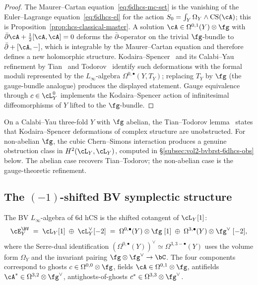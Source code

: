 \begin{proof}
The Maurer--Cartan equation~\eqref{eq:6dhcs-mc-set} is the vanishing
of the Euler--Lagrange equation~\eqref{eq:6dhcs-el} for the action
$S_0 = \int_Y\Omega_Y\wedge\mathrm{CS}(\cA)$; this is
Proposition~\ref{prop:hcs-classical-master}. A solution
$\cA\in\Omega^{0,1}(Y)\otimes\fg$ with
$\bar\partial\cA + \tfrac12[\cA,\cA] = 0$ deforms the
$\bar\partial$-operator on the trivial $\fg$-bundle to
$\bar\partial + [\cA,-]$, which is integrable by the
Maurer--Cartan equation and therefore defines a new holomorphic
structure. Kodaira--Spencer~\cite{KodairaSpencer1958} and its
Calabi--Yau refinement by Tian~\cite{Tian1987} and
Todorov~\cite{Todorov1989} identify such deformations with the
formal moduli represented by the $L_\infty$-algebra
$\Omega^{0,\bullet}(Y,T_Y)$; replacing $T_Y$ by $\fg$ (the
gauge-bundle analogue) produces the displayed statement. Gauge
equivalence through $c\in\cL_Y^0$ implements the
Kodaira--Spencer action of infinitesimal diffeomorphisms of $Y$
lifted to the $\fg$-bundle.
\end{proof}

\begin{remark}
\label{rem:6dhcs-tian-todorov}
On a Calabi--Yau three-fold $Y$ with $\fg$ abelian, the
Tian--Todorov lemma~\cite{Tian1987,Todorov1989} states that
Kodaira--Spencer deformations of complex structure are unobstructed.
For non-abelian $\fg$, the cubic Chern--Simons interaction produces a
genuine obstruction class in $H^2(\cL_Y,\cL_Y)$, computed in
\S\ref{subsec:vol2-bvbrst-6dhcs-obs} below. The abelian case recovers
Tian--Todorov; the non-abelian case is the gauge-theoretic refinement.
\end{remark}

\subsection{The $(-1)$-shifted BV symplectic structure}
\label{subsec:vol2-bvbrst-6dhcs-bv-symp}

\begin{definition}
\label{def:6dhcs-shifted-cotangent}
The BV $L_\infty$-algebra of 6d hCS is the shifted cotangent of
$\cL_Y[1]$:
\begin{equation}\label{eq:6dhcs-shifted-cotangent}
 \cE^{\BV}_Y
 \;=\;
 \cL_Y[1]\;\oplus\;\cL_Y^\vee[-2]
 \;=\;
 \Omega^{0,\bullet}(Y)\otimes\fg\;[1]
 \;\oplus\;
 \Omega^{3,\bullet}(Y)\otimes\fg^\vee\;[-2],
\end{equation}
where the Serre-dual identification
$(\Omega^{0,\bullet}(Y))^\vee\simeq\Omega^{3,3-\bullet}(Y)$ uses the
volume form $\Omega_Y$ and the invariant pairing
$\fg\otimes\fg^\vee\to\bC$. The four components correspond to
ghosts $c\in\Omega^{0,0}\otimes\fg$, fields
$\cA\in\Omega^{0,1}\otimes\fg$, antifields
$\cA^*\in\Omega^{3,2}\otimes\fg^\vee$, antighosts-of-ghosts
$c^*\in\Omega^{3,3}\otimes\fg^\vee$.
\end{definition}

